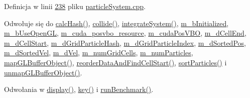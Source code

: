 Definicja w linii \hyperlink{particle_system_8cpp_source_l00238}{238} pliku \hyperlink{particle_system_8cpp_source}{particle\-System.\-cpp}.



Odwołuje się do \hyperlink{particle_system__cuda_8cu_source_l00157}{calc\-Hash()}, \hyperlink{particle_system__cuda_8cu_source_l00219}{collide()}, \hyperlink{particle_system__cuda_8cu_source_l00143}{integrate\-System()}, \hyperlink{particle_system_8h_source_l00152}{m\-\_\-b\-Initialized}, \hyperlink{particle_system_8h_source_l00152}{m\-\_\-b\-Use\-Open\-G\-L}, \hyperlink{particle_system_8h_source_l00184}{m\-\_\-cuda\-\_\-posvbo\-\_\-resource}, \hyperlink{particle_system_8h_source_l00181}{m\-\_\-cuda\-Pos\-V\-B\-O}, \hyperlink{particle_system_8h_source_l00174}{m\-\_\-d\-Cell\-End}, \hyperlink{particle_system_8h_source_l00173}{m\-\_\-d\-Cell\-Start}, \hyperlink{particle_system_8h_source_l00171}{m\-\_\-d\-Grid\-Particle\-Hash}, \hyperlink{particle_system_8h_source_l00172}{m\-\_\-d\-Grid\-Particle\-Index}, \hyperlink{particle_system_8h_source_l00167}{m\-\_\-d\-Sorted\-Pos}, \hyperlink{particle_system_8h_source_l00168}{m\-\_\-d\-Sorted\-Vel}, \hyperlink{particle_system_8h_source_l00165}{m\-\_\-d\-Vel}, \hyperlink{particle_system_8h_source_l00190}{m\-\_\-num\-Grid\-Cells}, \hyperlink{particle_system_8h_source_l00153}{m\-\_\-num\-Particles}, \hyperlink{particle_system__cuda_8cu_source_l00093}{map\-G\-L\-Buffer\-Object()}, \hyperlink{particle_system__cuda_8cu_source_l00178}{reorder\-Data\-And\-Find\-Cell\-Start()}, \hyperlink{particle_system__cuda_8cu_source_l00263}{sort\-Particles()} i \hyperlink{particle_system__cuda_8cu_source_l00103}{unmap\-G\-L\-Buffer\-Object()}.



Odwołania w \hyperlink{particles_8cpp_source_l00248}{display()}, \hyperlink{particles_8cpp_source_l00520}{key()} i \hyperlink{particles_8cpp_source_l00194}{run\-Benchmark()}.


